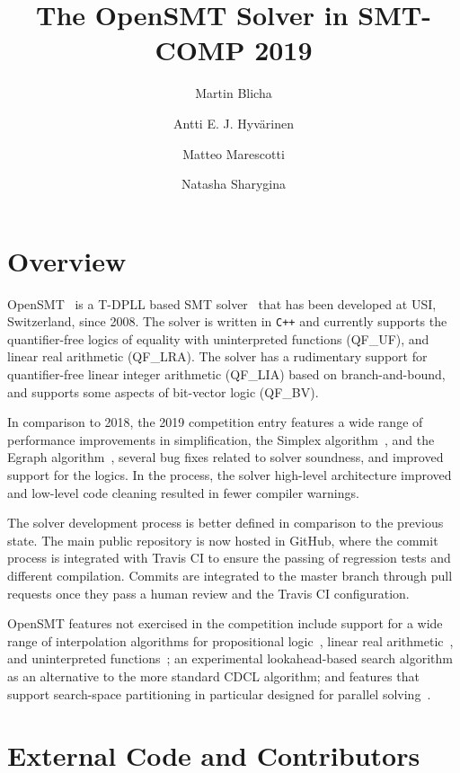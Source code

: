 \documentclass{easychair}
\title{The OpenSMT Solver in SMT-COMP 2019}
\author{
Martin Blicha \and 
Antti E. J. Hyv{\"a}rinen \and
Matteo Marescotti \and
Natasha Sharygina \\
}
\institute{Universit{\`a} della Svizzera italiana (USI), Lugano,
Switzerland}
\date{}
\begin{document}
\maketitle

\section{Overview}

OpenSMT~\cite{HyvarinenMAS16} is a T-DPLL based SMT
solver~\cite{NieuwenhuisOT:JACM06} that has been developed at USI,
Switzerland, since 2008.  The solver is written in {\tt C++} and
currently supports the quantifier-free logics of equality with
uninterpreted functions (QF\_UF), and linear real arithmetic (QF\_LRA).
The solver has a rudimentary support for quantifier-free linear integer
arithmetic (QF\_LIA) based on branch-and-bound, and supports some
aspects of bit-vector logic (QF\_BV).

In comparison to 2018, the 2019 competition entry features a wide range
of performance improvements in simplification, the Simplex
algorithm~\cite{DutertreM:CAV06}, and the Egraph
algorithm~\cite{DetlefsNS:JAC05}, several bug fixes related to solver
soundness, and improved support for the logics.  In the process, the
solver high-level architecture improved and low-level code cleaning
resulted in fewer compiler warnings.

The solver development process is better defined in comparison to the
previous state.  The main public repository
 is now
hosted in GitHub, where the commit process is integrated with Travis CI
to ensure the passing of regression tests and different compilation.
Commits are integrated to the master branch through pull requests once
they pass a human review and the Travis CI configuration.

OpenSMT features not exercised in the competition include support for a
wide range of interpolation algorithms for propositional
logic~\cite{AltFHS:VSTTE2015}, linear real
arithmetic~\cite{BlichaHKS19}, and uninterpreted
functions~\cite{AltHAS:FMCAD17}; an experimental look\-ahead-based
search algorithm~\cite{HyvarinenMSCS18} as an alternative to the more
standard CDCL algorithm; and features that support search-space
partitioning in particular designed for parallel
solving~\cite{HyvarinenMS:SAT15}.

\section{External Code and Contributors}
\end{document}
